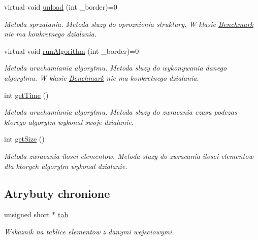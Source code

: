\begin{DoxyCompactItemize}
virtual void \hyperlink{class_benchmark_a2dcfb6ee9e648ae88d8c131b2b191bed}{unload} (int \-\_\-border)=0
\begin{DoxyCompactList}\small\item\em Metoda sprzatania. Metoda sluzy do oproznienia struktury. W klasie \hyperlink{class_benchmark}{Benchmark} nie ma konkretnego dzialania. \end{DoxyCompactList}\item 
virtual void \hyperlink{class_benchmark_a33e60395b1e126ca65c3aea3abf6debf}{run\-Algorithm} (int \-\_\-border)=0
\begin{DoxyCompactList}\small\item\em Metoda uruchamiania algorytmu. Metoda sluzy do wykonywania danego algorytmu. W klasie \hyperlink{class_benchmark}{Benchmark} nie ma konkretnego dzialania. \end{DoxyCompactList}\item 
int \hyperlink{class_benchmark_a6dd12b4b4015fc77e2e45145fbe963f8}{get\-Time} ()
\begin{DoxyCompactList}\small\item\em Metoda uruchamiania algorytmu. Metoda sluzy do zwracania czasu podczas ktorego algorytm wykonal swoje dzialanie. \end{DoxyCompactList}\item 
int \hyperlink{class_benchmark_a92d5722135cedffec12aebe55c829ba1}{get\-Size} ()
\begin{DoxyCompactList}\small\item\em Metoda zwracania ilosci elementow. Metoda sluzy do zwracania ilosci elementow dla ktorych algorytm wykonal dzialanie. \end{DoxyCompactList}\end{DoxyCompactItemize}
\subsection*{Atrybuty chronione}
\begin{DoxyCompactItemize}
\item 
unsigned short $\ast$ \hyperlink{class_benchmark_a6046a2f509673ad153a54cdfe3aef5cf}{tab}
\begin{DoxyCompactList}\small\item\em Wskaznik na tablice elementow z danymi wejsciowymi. \end{DoxyCompactList}\end{DoxyCompactItemize}
